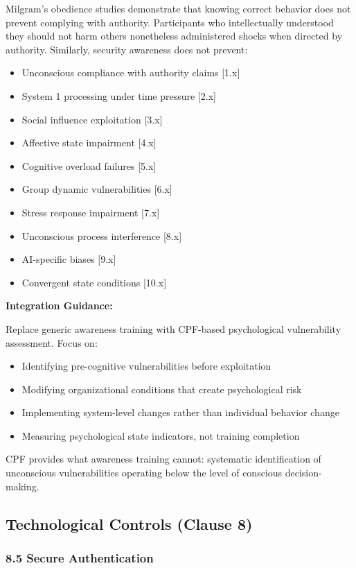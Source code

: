 \documentclass[11pt,a4paper]{article}
\begin{document}
Milgram's obedience studies demonstrate that knowing correct behavior does not prevent complying with authority. Participants who intellectually understood they should not harm others nonetheless administered shocks when directed by authority. Similarly, security awareness does not prevent:

\begin{itemize}
\item Unconscious compliance with authority claims [1.x]
\item System 1 processing under time pressure [2.x]
\item Social influence exploitation [3.x]
\item Affective state impairment [4.x]
\item Cognitive overload failures [5.x]
\item Group dynamic vulnerabilities [6.x]
\item Stress response impairment [7.x]
\item Unconscious process interference [8.x]
\item AI-specific biases [9.x]
\item Convergent state conditions [10.x]
\end{itemize}

\textbf{Integration Guidance:}

Replace generic awareness training with CPF-based psychological vulnerability assessment. Focus on:
\begin{itemize}
\item Identifying pre-cognitive vulnerabilities before exploitation
\item Modifying organizational conditions that create psychological risk
\item Implementing system-level changes rather than individual behavior change
\item Measuring psychological state indicators, not training completion
\end{itemize}

CPF provides what awareness training cannot: systematic identification of unconscious vulnerabilities operating below the level of conscious decision-making.

\subsection{Technological Controls (Clause 8)}

\subsubsection{8.5 Secure Authentication}
\end{document}
